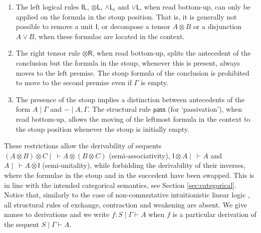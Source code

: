 \documentclass[submission,copyright,creativecommons]{eptcs}
\theoremstyle{definition}
\newcommand{\tl}{\otimes \mathsf{L}}
\newcommand{\tr}{\otimes \mathsf{R}}
\newcommand{\pass}{\mathsf{pass}}
\newcommand{\unitl}{\mathsf{IL}}
\newcommand{\andli}{\land \mathsf{L}_{i}}
\newcommand{\orl}{\lor \mathsf{L}}
\newcommand{\ot}{\otimes}
\newcommand{\lolli}{\multimap}
\newcommand{\illol}{\rotatebox[origin=c]{180}{$\multimap$}}
\newcommand{\I}{\mathsf{I}}
\newcommand{\NMILL}{$\mathtt{NMILL}$}
\newcommand{\SkNMILL}{$\mathtt{SkNMILL}$}
\begin{document}
\begin{enumerate}
\item The left logical rules $\unitl$, $\tl$, $\andli$ and $\orl$, when read bottom-up, can only be applied on the formula in the stoup position. 
That is, it is generally not possible to remove a unit $\I$, or decompose a tensor $A \ot B$ or a disjunction $A \lor B$, when these formulae are located in the context.
\item The right tensor rule $\tr$, when read bottom-up, splits the antecedent of the conclusion but the formula in the stoup, whenever this is present, always moves to the left premise.
The stoup formula of the conclusion is prohibited to move to the second premise even if $\Gamma$ is empty. 
\item The presence of the stoup implies a distinction between antecedents of the form $A \mid \Gamma$ and ${-} \mid A, \Gamma$. The structural rule $\pass$ (for `passivation'), when read bottom-up, allows the moving of the leftmost formula in the context to the stoup position whenever the stoup is initially empty.
\end{enumerate}
These restrictions allow the derivability of sequents $(A \ot B) \ot C \mid ~\vdash A \ot (B\ot C)$ (semi-associativity), $\I \ot A \mid ~ \vdash A$ and $A \mid ~ \vdash A \ot \I$ (semi-unitality), while forbidding the derivability of their inverses, where the formulae in the stoup and in the succedent have been swapped. This is in line with the intended categorical semantics, see Section \ref{sec:categorical}.
Notice that, similarly to the case of non-commutative intuitionistic linear logic \cite{abrusci:noncommutative:1990}, all structural rules of exchange, contraction and weakening are absent. We give names to derivations and we write $f : S \mid \Gamma \vdash A$ when $f$ is a particular derivation of the sequent $S \mid \Gamma \vdash A$.
\end{document}
